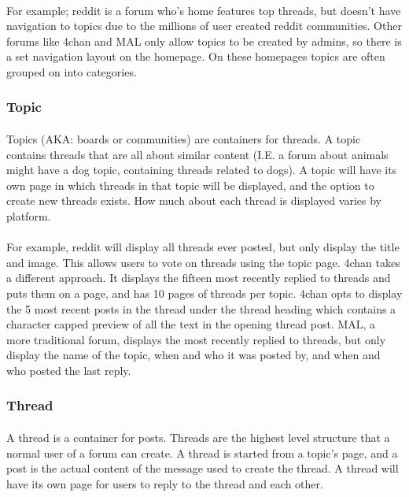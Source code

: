 \documentclass[]{article}
\begin{document}
\paragraph{}
For example; reddit is a forum who's home features top threads, but doesn't have navigation to topics due to the millions of user created reddit communities. Other forums like 4chan and MAL only allow topics to be created by admins, so there is a set navigation layout on the homepage. On these homepages topics are often grouped on into categories. 

\subsubsection{Topic}
\paragraph{}
Topics (AKA: boards or communities) are containers for threads. A topic contains threads that are all about similar content (I.E. a forum about animals might have a dog topic, containing threads related to dogs). A topic will have its own page in which threads in that topic will be displayed, and the option to create new threads exists. How much about each thread is displayed varies by platform.
\paragraph{}
For example, reddit will display all threads ever posted, but only display the title and image. This allows users to vote on threads using the topic page. 4chan takes a different approach. It displays the fifteen most recently replied to threads and puts them on a page, and has 10 pages of threads per topic. 4chan opts to display the 5 most recent posts in the thread under the thread heading which contains a character capped preview of all the text in the opening thread post. MAL, a more traditional forum, displays the most recently replied to threads, but only display the name of the topic, when and who it was posted by, and when and who posted the last reply. 

\subsubsection{Thread}
\paragraph{}
A thread is a container for posts. Threads are the highest level structure that a normal user of a forum can create. A thread is started from a topic's page, and a post is the actual content of the message used to create the thread. A thread will have its own page for users to reply to the thread and each other.
\end{document}
